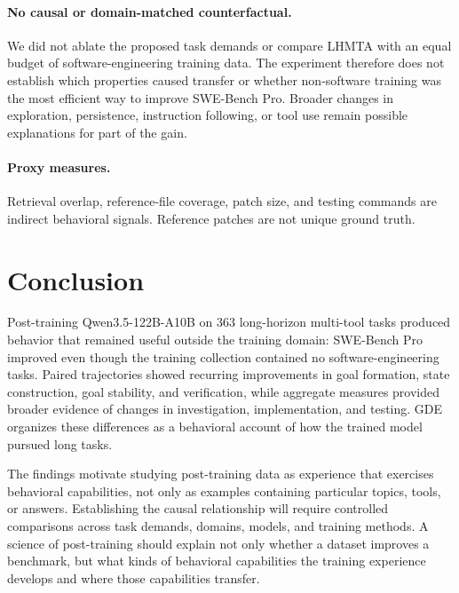 \documentclass{article}
\begin{document}
\paragraph{No causal or domain-matched counterfactual.} We did not ablate the proposed task demands or compare LHMTA with an equal budget of software-engineering training data. The experiment therefore does not establish which properties caused transfer or whether non-software training was the most efficient way to improve SWE-Bench Pro. Broader changes in exploration, persistence, instruction following, or tool use remain possible explanations for part of the gain.

\paragraph{Proxy measures.} Retrieval overlap, reference-file coverage, patch size, and testing commands are indirect behavioral signals. Reference patches are not unique ground truth.

\section{Conclusion}
\label{sec:conclusion}

Post-training Qwen3.5-122B-A10B on 363 long-horizon multi-tool tasks produced behavior that remained useful outside the training domain: SWE-Bench Pro improved even though the training collection contained no software-engineering tasks. Paired trajectories showed recurring improvements in goal formation, state construction, goal stability, and verification, while aggregate measures provided broader evidence of changes in investigation, implementation, and testing. GDE organizes these differences as a behavioral account of how the trained model pursued long tasks.

The findings motivate studying post-training data as experience that exercises behavioral capabilities, not only as examples containing particular topics, tools, or answers. Establishing the causal relationship will require controlled comparisons across task demands, domains, models, and training methods. A science of post-training should explain not only whether a dataset improves a benchmark, but what kinds of behavioral capabilities the training experience develops and where those capabilities transfer.




\appendix
\end{document}
